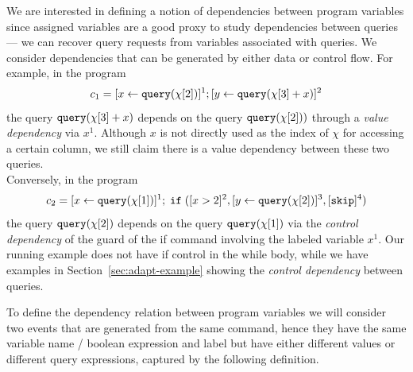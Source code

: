 We are interested in defining a notion of dependencies between program variables since assigned variables are a good proxy to study dependencies between queries--- we can recover query requests from variables associated with queries. We consider dependencies that can be generated by either data or control flow.
For example, in the program 
\[c_1 =[\mathrel{ x \leftarrow {\tt query}(\chi[2]) }]^1 ;[\mathrel{ y \leftarrow {\tt query}(\chi[3] + x) }]^2\]
the query ${\tt query}(\chi[3] + x)$ depends on the query ${\tt query}(\chi[2]))$ through a \emph{value dependency} via $x^1$. Although $x$ is not directly used as the index of $\chi$ for accessing a certain column, we still claim there is a value dependency between
these two queries.
\\
Conversely, in the program
\[c_2 = [\mathrel{ x \leftarrow {\tt query}(\chi[1]) }]^1 ; \;\mathtt{if}\;( [x > 2]^2 , [\mathrel{ y \leftarrow {\tt query}(\chi[2]) }]^3, [\mathtt{skip}]^4 )\] 
the query ${\tt query}(\chi[2])$ 
depends on the query ${\tt query}(\chi[1])$ via the \emph{control dependency} of the guard of the if command involving the labeled variable $x^1$.
Our running example does not have if control in the while body, while we have examples in Section~\ref{sec:adapt-example} showing the \emph{control dependency} between queries.

To define the dependency relation between program variables we will consider two events that are generated from the same command, hence they have the same variable name / boolean expression and label but have either different values or different query expressions, captured by the following definition. 

